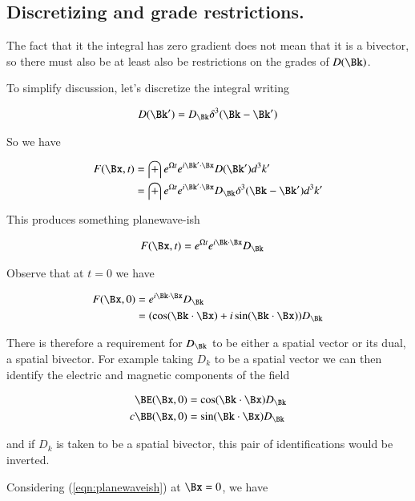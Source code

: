 \subsection{Discretizing and grade restrictions.}

The fact that it the integral has zero gradient does not mean that it is a bivector, so there must also be at least also be restrictions on the grades of $D(\Bk)$.

To simplify discussion, let's discretize the integral writing

\begin{align*}
D(\Bk') = D_\Bk \delta^3 (\Bk - \Bk')
\end{align*}

So we have

\begin{align*}
F(\Bx,t)
&= \int e^{\Omega t} e^{i \Bk' \cdot \Bx} D(\Bk') d^3 k' \\
&= \int e^{\Omega t} e^{i \Bk' \cdot \Bx} D_\Bk \delta^3(\Bk - \Bk') d^3 k' \\
\end{align*}

This produces something planewave-ish

\begin{align}\label{eqn:planewaveish}
F(\Bx,t) &= e^{\Omega t} e^{i \Bk \cdot \Bx} D_\Bk
\end{align}

Observe that at $t=0$ we have

\begin{align*}
F(\Bx,0)
&= e^{i \Bk \cdot \Bx} D_\Bk  \\
&= (\cos (\Bk \cdot \Bx) + i \sin(\Bk \cdot \Bx)) D_\Bk  \\
\end{align*}

There is therefore a requirement for $D_\Bk$ to be either a spatial vector or its dual, a spatial bivector.  For example taking $D_k$ to be a spatial vector we can then identify the electric and magnetic components of the field

\begin{align*}
\BE(\Bx,0) &= \cos (\Bk \cdot \Bx) D_\Bk \\
c \BB(\Bx,0) &= \sin (\Bk \cdot \Bx) D_\Bk
\end{align*}

and if $D_k$ is taken to be a spatial bivector, this pair of identifications would be inverted.

Considering (\ref{eqn:planewaveish}) at $\Bx=0$, we have

